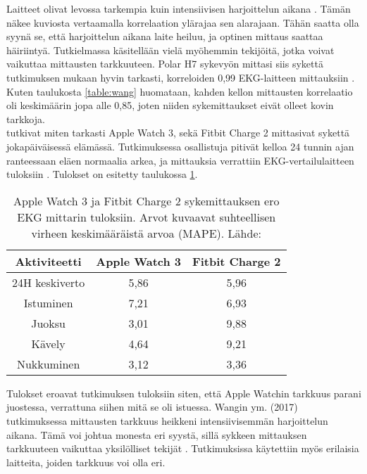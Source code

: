 \documentclass[utf8,bachelor,finnish]{bachelor}
\begin{document}
  Laitteet olivat levossa tarkempia kuin intensiivisen harjoittelun aikana \parencite{wang_accuracy_2017}. Tämän näkee kuviosta vertaamalla korrelaation ylärajaa sen alarajaan.
   Tähän saatta olla syynä se, että harjoittelun aikana laite heiluu, ja optinen mittaus saattaa häiriintyä. Tutkielmassa käsitellään vielä myöhemmin tekijöitä, jotka voivat vaikuttaa mittausten tarkkuuteen. 
    Polar H7 sykevyön mittasi siis sykettä tutkimuksen mukaan hyvin tarkasti, korreloiden 0,99 EKG-laitteen mittauksiin \parencite{wang_accuracy_2017}.
     Kuten taulukosta \ref{table:wang} huomataan, kahden kellon mittausten korrelaatio oli keskimäärin jopa alle 0,85, joten niiden sykemittaukset eivät olleet kovin tarkkoja.\\
  
  \textcite{nelson_accuracy_2019} tutkivat miten tarkasti Apple Watch 3, sekä Fitbit Charge 2 mittasivat sykettä jokapäiväisessä elämässä.
   Tutkimuksessa osallistuja pitivät kelloa 24 tunnin ajan ranteessaan eläen normaalia arkea, ja mittauksia verrattiin
    EKG-vertailulaitteen tuloksiin \parencite{nelson_accuracy_2019}. Tulokset on esitetty taulukossa \ref{table:nelson}.\\
    
    \begin{table}[H]
     \begin{center}
      \begin{tabular}{||c c c||}   
       \hline
       Aktiviteetti & Apple Watch 3 & Fitbit Charge 2\\ [0.5ex] 
       \hline\hline
       24H keskiverto & 5,86 & 5,96\\ 
       \hline
       Istuminen & 7,21 & 6,93\\ 
       \hline
       Juoksu & 3,01 & 9,88 \\
       \hline
       Kävely & 4,64 & 9,21\\
       \hline
       Nukkuminen & 3,12 & 3,36\\[1ex] 
       \hline
      \end{tabular}
    \caption{Apple Watch 3 ja Fitbit Charge 2 sykemittauksen ero EKG mittarin tuloksiin. Arvot kuvaavat suhteellisen virheen keskimääräistä arvoa (MAPE). Lähde: \textcite{nelson_accuracy_2019}}
    \label{table:nelson}
     \end{center} 
    \end{table}

  Tulokset eroavat \textcite{wang_accuracy_2017} tutkimuksen tuloksiin siten, että Apple Watchin tarkkuus parani juostessa, verrattuna siihen mitä se oli istuessa. Wangin ym. (2017) tutkimuksessa
   mittausten tarkkuus heikkeni intensiivisemmän harjoittelun aikana. Tämä voi johtua monesta eri syystä, sillä sykkeen mittauksen tarkkuuteen vaikuttaa yksilölliset tekijät \parencite{koerber_accuracy_2022,pasadyn_accuracy_2019,hochstadt_continuous_2020}.
    Tutkimuksissa käytettiin myös erilaisia laitteita, joiden tarkkuus voi olla eri. \\
\end{document}
